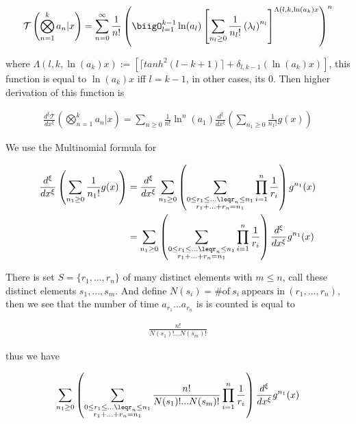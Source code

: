 \begin{align}
        \mathcal{T}\left(\bigotimes_{n=1}^ka_n | x\right) = \sum_{n=0}^\infty 
        \frac{1}{n!}\left(\biigO_{l=1}^{k-1}\ln(a_l)\left[\sum_{n_l\geq0}
        \frac{1}{n_l!}\left(\lambda_l\right)^{n_l}\right]^{\Lambda(l, k,
        \ln(a_k)x}\right)^n
\end{align}

where \(\Lambda(l, k, \ln(a_k)x) :=\left[\lceil tanh^2(l-k+1)\rceil+
\delta_{l, k-1}(\ln(a_k)x)\right]\), this function is equal to \(\ln(a_k)x\)
iff \(l=k-1\), in other cases, its 0. Then higher derivation of this function is

\begin{align}
        \frac{d^\xi\mathcal{T}}{dx^\xi}\left(\bigotimes_{n=1}^ka_n | x\right) 
        = \sum_{n\geq0}\frac{1}{n!}\ln^n(a_1) \frac{d^\xi}{dx^\xi}\left(\sum_{n_1
        \geq0}\frac{1}{n_1!}g(x)\right)
\end{align}

We use the Multinomial formula for

\begin{align}
    \frac{d^\xi}{dx^\xi}\left(\sum_{n_1\geq0}\frac{1}{n_1!}g(x)\right) &=  
    \frac{d^\xi}{dx^\xi} \sum_{n_1\geq0} \left(\sum_{\substack{0\leq r_1 \leq
    ...\leqr_n\leq n_1 \\ r_1 +...+r_n = n_1}}\prod_{i=1}^n \frac{1}{r_i}\right)
    g^{n_1}(x) \\
    &=\sum_{n_1\geq0} \left(\sum_{\substack{0\leq r_1 \leq...\leqr_n\leq n_1 \\
    r_1 +...+r_n = n_1}}\prod_{i=1}^n \frac{1}{r_i}\right)\frac{d^\xi}{dx^\xi}g^{n_1}(x)
\end{align}

There is set \(S=\{r_1, ..., r_n\}\) of many distinct elements with \(m \leq n\),
call these distinct elements \(s_1, ..., s_m\). And define \(N(s_i) = \# \mbox{of}
\ s_i \ \mbox{appears in} \ (r_1, ..., r_n) \), then we see that the number of time 
\(a_{r_1}...a_{r_n}\) is is counted is equal to 

\begin{align}
        \frac{n!}{N(s_1)!...N(s_m)!}
\end{align}

thus we have

\begin{align}
        \sum_{n_1\geq0} \left(\sum_{\substack{0\leq r_1 \leq...\leqr_n\leq n_1
        \\ r_1 +...+r_n = n_1}}\frac{n!}{N(s_1)!...N(s_m)!}\prod_{i=1}^n
        \frac{1}{r_i}\right)\frac{d^\xi}{dx^\xi}g^{n_1}(x)
\end{align}

